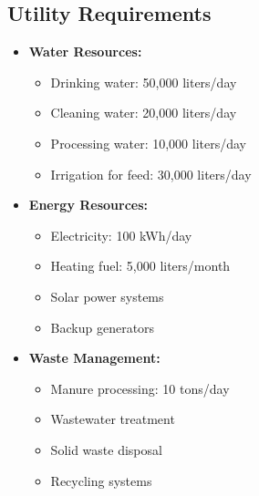 \subsection{Utility Requirements}
\begin{itemize}
    \item \textbf{Water Resources:}
    \begin{itemize}
        \item Drinking water: 50,000 liters/day
        \item Cleaning water: 20,000 liters/day
        \item Processing water: 10,000 liters/day
        \item Irrigation for feed: 30,000 liters/day
    \end{itemize}
    
    \item \textbf{Energy Resources:}
    \begin{itemize}
        \item Electricity: 100 kWh/day
        \item Heating fuel: 5,000 liters/month
        \item Solar power systems
        \item Backup generators
    \end{itemize}
    
    \item \textbf{Waste Management:}
    \begin{itemize}
        \item Manure processing: 10 tons/day
        \item Wastewater treatment
        \item Solid waste disposal
        \item Recycling systems
    \end{itemize}
\end{itemize}

